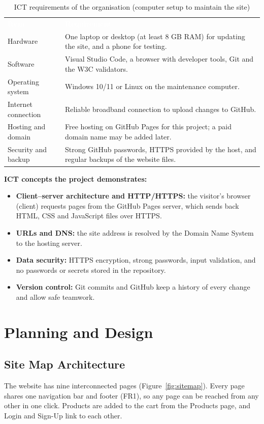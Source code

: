 \documentclass[10pt,a4paper]{article}
\newcommand{\hc}[1]{\textcolor{white}{\bfseries #1}}
\newcommand{\tbl}{\rowcolors{2}{white}{gkbg}\renewcommand{\arraystretch}{1.2}\footnotesize}
\begin{document}
\begin{table}[H]
\centering
\caption{ICT requirements of the organisation (computer setup to maintain the site)}
\tbl
\begin{tabularx}{\textwidth}{@{}lY@{}}
\hc{Item} & \hc{Requirement}\\
Hardware & One laptop or desktop (at least 8 GB RAM) for updating the site, and a phone for testing.\\
Software & Visual Studio Code, a browser with developer tools, Git and the W3C validators.\\
Operating system & Windows 10/11 or Linux on the maintenance computer.\\
Internet connection & Reliable broadband connection to upload changes to GitHub.\\
Hosting and domain & Free hosting on GitHub Pages for this project; a paid domain name may be added later.\\
Security and backup & Strong GitHub passwords, HTTPS provided by the host, and regular backups of the website files.\\
\end{tabularx}
\end{table}

\textbf{ICT concepts the project demonstrates:}
\begin{itemize}
\item \textbf{Client--server architecture and HTTP/HTTPS:} the visitor's browser (client) requests pages from the GitHub Pages server, which sends back HTML, CSS and JavaScript files over HTTPS.
\item \textbf{URLs and DNS:} the site address is resolved by the Domain Name System to the hosting server.
\item \textbf{Data security:} HTTPS encryption, strong passwords, input validation, and no passwords or secrets stored in the repository.
\item \textbf{Version control:} Git commits and GitHub keep a history of every change and allow safe teamwork.
\end{itemize}

\section{Planning and Design}

\subsection{Site Map Architecture}
The website has nine interconnected pages (Figure~\ref{fig:sitemap}). Every page shares one navigation bar and footer (FR1), so any page can be reached from any other in one click. Products are added to the cart from the Products page, and Login and Sign-Up link to each other.
\end{document}
